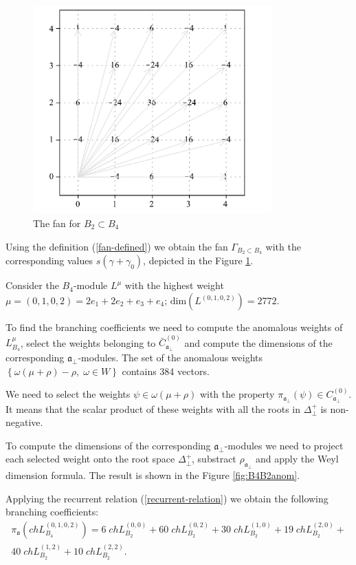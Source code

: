 \documentclass[a4paper,12pt]{article}
\theoremstyle{definition} \newtheorem{Def}{Definition}
\begin{document}
\begin{figure}[p]
  \centering
  \includegraphics[height=80mm]{B4_B2_fan.pdf}
  \caption{The fan for $B_2\subset B_4$}
  \label{fig:B4B2Fan}
\end{figure}

Using the definition (\ref{fan-defined}) we obtain the fan $\Gamma_{B_2\subset B_4}$ with the corresponding values $s(\gamma+\gamma_0)$, depicted in the Figure \ref{fig:B4B2Fan}.


Consider the $B_4$-module $L^{\mu}$ with the highest weight $\mu=(0,1,0,2)=2
e_1 + 2 e_2 + e_3 + e_4$; $\mathrm{dim}(L^{(0,1,0,2)})=2772$.

To find the branching coefficients we need to compute the anomalous weights of $L^{\mu}_{B_4}$, select the weights belonging to $\bar{C}^{\left( 0 \right)}_{\mathfrak{a}_{\bot}}$ and compute the dimensions of the corresponding $\mathfrak{a}_{\bot}$-modules.
The set of the anomalous weights $\left\{ \omega(\mu+\rho)-\rho,\; \omega\in W\right\}$
contains 384 vectors.

We need to select the weights $\psi \in \omega(\mu+\rho)$  with the property $\pi_{\mathfrak{a}_{\bot}} \left(  \psi \right) \in C^{\left( 0 \right)}_{\mathfrak{a}_{\bot}}$.
It means that the scalar product of these weights with all the roots in $\Delta^{+}_{\bot}$ is non-negative.

To compute the dimensions of the corresponding
$\mathfrak{a}_{\bot}$-modules we need to project each selected weight
onto the root space $\Delta^{+}_{\bot}$, substract
$\rho_{\mathfrak{a}_{\bot}}$ and apply the Weyl dimension formula. The result is shown in the Figure \ref{fig:B4B2anom}.

Applying the recurrent relation (\ref{recurrent-relation}) we obtain the
following branching coefficients:
\begin{multline}
  \label{eq:24}
  \pi_{\mathfrak{a}} \left(ch L^{(0,1,0,2)}_{B_4}\right) = 6 \; ch L^{(0,0)}_{B_2}+ 60
  \; ch L_{B_2}^{(0,2)}+ 30 \; ch L_{B_2}^{(1,0)}+ 19 \; ch L_{B_2}^{(2,0)}+\\
  40 \; ch L_{B_2}^{(1,2)}+ 10 \; ch L_{B_2}^{(2,2)}.
\end{multline}
\newpage
\end{document}
